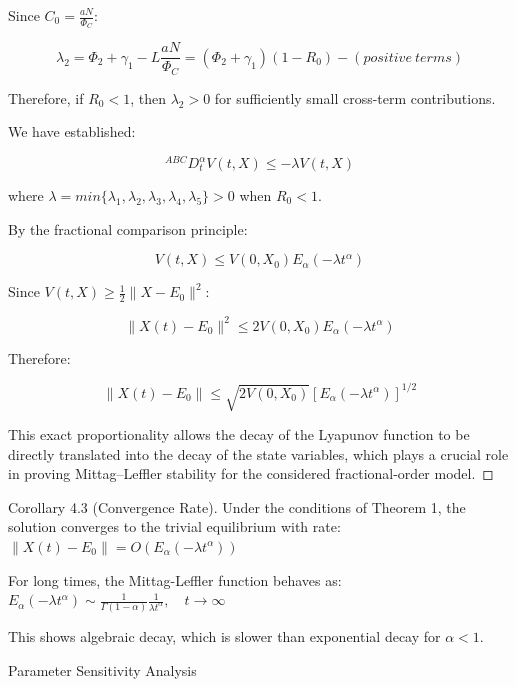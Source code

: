 \documentclass[10pt]{NSP1}
\begin{document}
Since \(C_{0} = \frac{aN}{\Phi_{C}}\):

\[
\lambda_{2} = \Phi_{2} + \gamma_{1} - L\frac{aN}{\Phi_{C}} = \left( \Phi_{2} + \gamma_{1} \right)\left( 1 - R_{0} \right) - (positive\ terms)
\]

Therefore, if \(R_{0} < 1\), then \(\lambda_{2} > 0\) for sufficiently small cross-term contributions.

We have established:

\[
^{ABC}D_{t}^{\alpha}V(t,X) \leq - \lambda V(t,X)
\]

where \(\lambda = min\{\lambda_{1},\lambda_{2},\lambda_{3},\lambda_{4},\lambda_{5}\} > 0\) when \(R_{0} < 1\).

By the fractional comparison principle:

\[
V(t,X) \leq V\left( 0,X_{0} \right)E_{\alpha}\left( - \lambda t^{\alpha} \right)
\]

Since \(V(t,X) \geq \frac{1}{2} \parallel X - E_{0} \parallel^{2}\):

\[
\parallel X(t) - E_{0} \parallel^{2} \leq 2V\left( 0,X_{0} \right)E_{\alpha}\left( - \lambda t^{\alpha} \right)
\]

Therefore:

\[
\parallel X(t) - E_{0} \parallel \leq \sqrt{2V\left( 0,X_{0} \right)}\left\lbrack E_{\alpha}\left( - \lambda t^{\alpha} \right) \right\rbrack^{1/2}
\]

This exact proportionality allows the decay of the Lyapunov function to be directly translated into the decay of the state variables, which plays a crucial role in proving Mittag–Leffler stability for the considered fractional-order model. ◻

\par\medskip{}\smallskip

Corollary 4.3 (Convergence Rate). Under the conditions of Theorem 1, the solution converges to the trivial equilibrium with rate: \(\parallel X(t) - E_{0} \parallel = O\left( E_{\alpha}\left( - \lambda t^{\alpha} \right) \right)\)

For long times, the Mittag-Leffler function behaves as: \(E_{\alpha}\left( - \lambda t^{\alpha} \right) \sim \frac{1}{\Gamma(1 - \alpha)}\frac{1}{\lambda t^{\alpha}},\quad t \rightarrow \infty\)

This shows algebraic decay, which is slower than exponential decay for \(\alpha < 1\).

Parameter Sensitivity Analysis
\end{document}
